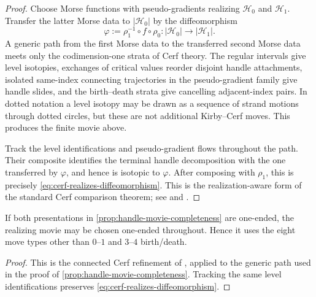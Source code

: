 \begin{proof}
Choose Morse functions with pseudo-gradients realizing \(\mathcal H_0\) and
\(\mathcal H_1\).  Transfer the latter Morse data to
\(|\mathcal H_0|\) by the diffeomorphism
\[
  \varphi:=\rho_1^{-1}\circ f\circ\rho_0
  \colon|\mathcal H_0|\longrightarrow|\mathcal H_1|.
\]
A generic path from the first Morse data to the transferred second Morse
data meets only the codimension-one strata of Cerf theory.  The regular
intervals give level isotopies, exchanges of critical values reorder
disjoint handle attachments, isolated same-index connecting trajectories in
the pseudo-gradient family give handle slides, and the birth--death strata
  give cancelling adjacent-index pairs.  In dotted notation a level isotopy
  may be drawn as a sequence of strand motions through dotted circles, but
  these are not additional Kirby--Cerf moves.  This produces the finite movie
  above.

Track the level identifications and pseudo-gradient flows throughout the
path.  Their composite identifies the terminal handle decomposition with
the one transferred by \(\varphi\), and hence is isotopic to \(\varphi\).
After composing with \(\rho_1\), this is precisely
\eqref{eq:cerf-realizes-diffeomorphism}.  This is the realization-aware form
of the standard Cerf comparison theorem; see \cite{Cerf1970} and
\cite[Theorem~4.2.12]{GompfStipsicz1999}.
\end{proof}

\begin{corollary}
\label{cor:one-ended-diffeomorphism-realization}
If both presentations in \cref{prop:handle-movie-completeness} are
one-ended, the realizing movie may be chosen one-ended throughout.  Hence it
uses the eight move types other than \(0\)--\(1\) and \(3\)--\(4\)
birth/death.
\end{corollary}

\begin{proof}
This is the connected Cerf refinement of
\cite[Remark~2.7 and Theorem~3.4]{GayWehrheimWoodward2012}, applied to the
generic path used in the proof of
\cref{prop:handle-movie-completeness}.  Tracking the same level
identifications preserves
\eqref{eq:cerf-realizes-diffeomorphism}.
\end{proof}
